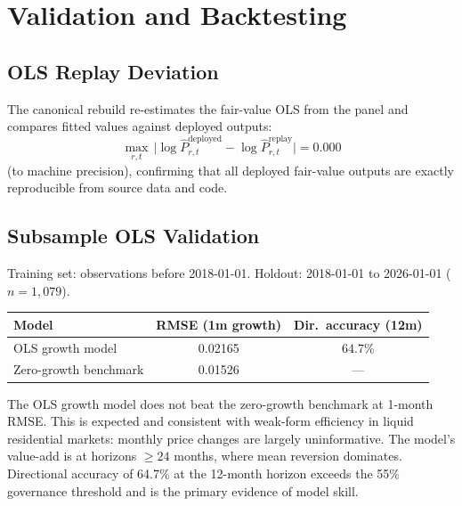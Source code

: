 \documentclass[11pt,a4paper]{article}
\theoremstyle{plain}
\theoremstyle{definition}
\begin{document}
\section{Validation and Backtesting}\label{sec:validation}

\subsection{OLS Replay Deviation}

The canonical rebuild re-estimates the fair-value OLS from the panel
and compares fitted values against deployed outputs:
\[
  \max_{r,t}\,\bigl|
    \log\widehat{P}^{\mathrm{deployed}}_{r,t}
    - \log\widehat{P}^{\mathrm{replay}}_{r,t}
  \bigr| = 0.000
\]
(to machine precision), confirming that all deployed fair-value outputs
are exactly reproducible from source data and code.

\subsection{Subsample OLS Validation}

Training set: observations before 2018-01-01.
Holdout: 2018-01-01 to 2026-01-01 ($n = 1{,}079$).

\begin{center}
\begin{tabular}{lcc}
\toprule
Model & RMSE (1m growth) & Dir.\ accuracy (12m) \\
\midrule
OLS growth model      & 0.02165 & 64.7\% \\
Zero-growth benchmark & 0.01526 & --- \\
\bottomrule
\end{tabular}
\end{center}

\begin{govbox}
The OLS growth model does not beat the zero-growth benchmark at 1-month
RMSE.  This is expected and consistent with weak-form efficiency in
liquid residential markets: monthly price changes are largely
uninformative.  The model's value-add is at horizons
$\geq 24$ months, where mean reversion dominates.  Directional accuracy
of 64.7\% at the 12-month horizon exceeds the 55\% governance threshold
and is the primary evidence of model skill.
\end{govbox}
\end{document}
